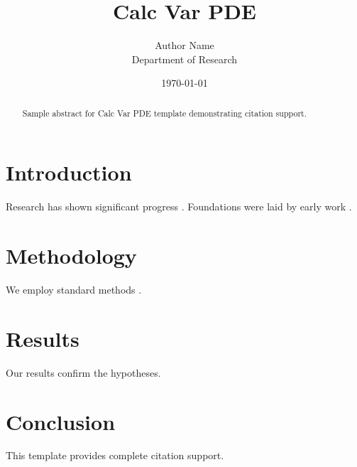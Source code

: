 \documentclass{llncs}
\title{Calc Var PDE}
\author{Author Name \\ \small Department of Research}
\date{\today}
\begin{document}
\maketitle

\begin{abstract}
Sample abstract for Calc Var PDE template demonstrating citation support.
\end{abstract}

\section{Introduction}
Research has shown significant progress \citep{einstein1905}. Foundations were laid by early work \citep{turing1950}.

\section{Methodology}
We employ standard methods \citep{knuth1984}.

\section{Results}
Our results confirm the hypotheses.

\section{Conclusion}
This template provides complete citation support.



\end{document}
